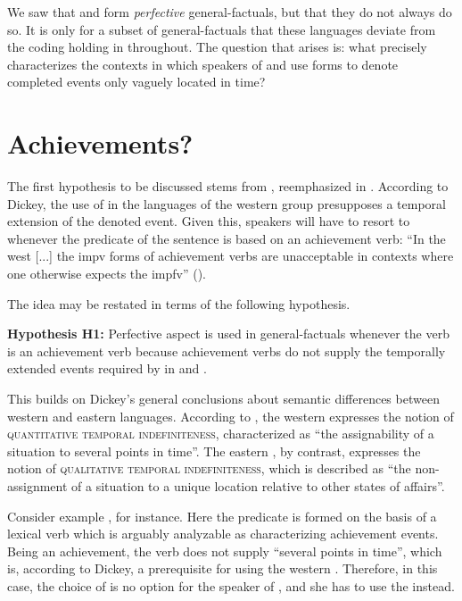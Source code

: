\documentclass[output=paper,modfonts,newtxmath,hidelinks]{langscibook}
\begin{document}
\noindent We saw that  and  form \textit{perfective} general-factuals, but that they do not always do so. 
It is only for a subset of general-factuals that 
these languages deviate from the  coding holding in  throughout. 
The question that arises is: what precisely characterizes the contexts in which speakers of  and   
use  forms to denote completed  events only vaguely located in time? 




\section{Achievements?}\label{13:s3} 
The first hypothesis to be discussed stems from \citet{Dickey2000}, reemphasized in \citet{Dickey18}. According to Dickey, the use of  in the languages of the 
western group presupposes a temporal extension of the denoted event. Given this, 
speakers will have to resort to  whenever the predicate of the sentence is based on an achievement verb:
``In the west [...] the impv forms of achievement verbs are unacceptable in contexts where one otherwise expects the impfv'' (\citealt[124]{Dickey2000}).

The idea may be restated in terms of the following hypothesis.
\begin{exe}
\ex\label{13:hypo1}
\textbf{Hypothesis H1:} Perfective aspect is used in general-factuals whenever the verb is an achievement verb because achievement verbs  do not supply the temporally extended events required by  in  and .
\end{exe}

\noindent This builds on Dickey's general conclusions about  semantic differences between western and eastern languages. According to \citet[107--109]{Dickey2000}, 
the western  expresses the notion of \textsc{quantitative temporal indefiniteness}, characterized as ``the assignability of a situation 
to several points in time''. The eastern , by contrast,   
expresses the notion of \textsc{qualitative temporal indefiniteness}, which is described as ``the non-assignment of a situation to 
a unique location relative to other states of affairs''. 

Consider example , for instance. Here the predicate is formed on the basis of a lexical verb 
which is arguably analyzable as characterizing achievement events.
Being an achievement, the verb does not supply ``several points in time'', which is, 
according to Dickey, a prerequisite for using the western . 
Therefore, in this case, the choice of  is no option for the speaker of , and she has to use the  instead.  
\end{document}
